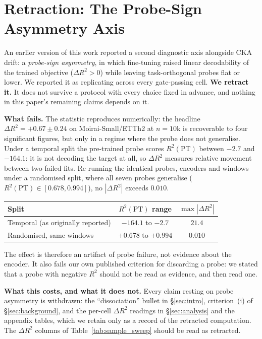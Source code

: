 \section{Retraction: The Probe-Sign Asymmetry Axis}
\label{sec:retraction}

An earlier version of this work reported a second diagnostic axis alongside
CKA drift: a \emph{probe-sign asymmetry}, in which fine-tuning raised linear
decodability of the trained objective ($\Delta R^2 {>} 0$) while leaving
task-orthogonal probes flat or lower. We reported it as replicating across
every gate-passing cell. \textbf{We retract it.} It does not survive a
protocol with every choice fixed in advance, and nothing in this paper's
remaining claims depends on it.

\textbf{What fails.} The statistic reproduces numerically: the headline
$\Delta R^2{=}{+}0.67{\pm}0.24$ on Moirai-Small/ETTh2 at $n{=}10$k is
recoverable to four significant figures, but only in a regime where the
probe does not generalise. Under a temporal split the pre-trained probe
scores $R^2(\text{PT})$ between $-2.7$ and $-164.1$: it is not decoding the
target at all, so $\Delta R^2$ measures relative movement between two failed
fits. Re-running the identical probes, encoders and windows under a
randomised split, where all seven probes generalise
($R^2(\text{PT}) \in [0.678, 0.994]$), no $|\Delta R^2|$ exceeds $0.010$.

\begin{center}
\small
\begin{tabular}{@{}lcc@{}}
\toprule
Split & $R^2(\text{PT})$ range & $\max |\Delta R^2|$ \\
\midrule
Temporal (as originally reported) & $-164.1$ to $-2.7$ & $21.4$ \\
Randomised, same windows          & $+0.678$ to $+0.994$ & $\mathbf{0.010}$ \\
\bottomrule
\end{tabular}
\end{center}

The effect is therefore an artifact of probe failure, not evidence about the
encoder. It also fails our own published criterion for discarding a probe: we
stated that a probe with negative $R^2$ should not be read as evidence, and
then read one.

\textbf{What this costs, and what it does not.} Every claim resting on probe
asymmetry is withdrawn: the ``dissociation'' bullet in
\S\ref{sec:intro}, criterion~(i) of \S\ref{sec:background}, and the
per-cell $\Delta R^2$ readings in \S\ref{sec:analysis} and the appendix
tables, which we retain only as a record of the retracted computation. The
$\Delta R^2$ columns of Table~\ref{tab:sample_sweep} should be read as
retracted.

